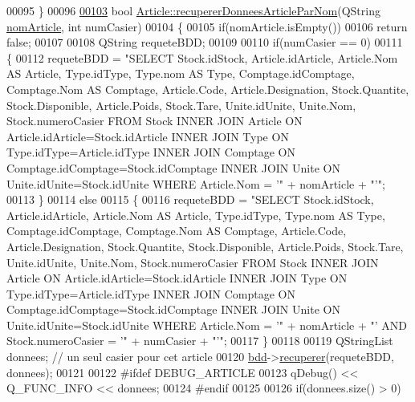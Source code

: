 \begin{DoxyCode}
00095 \}
00096 
\hyperlink{class_article_a6eab145b46f5e1786c5ddf669ffabb6e}{00103} \textcolor{keywordtype}{bool} \hyperlink{class_article_a6eab145b46f5e1786c5ddf669ffabb6e}{Article::recupererDonneesArticleParNom}(QString 
      \hyperlink{class_article_a0ba6c08f7dd54e4b7caf673ecd6b41a6}{nomArticle}, \textcolor{keywordtype}{int} numCasier)
00104 \{
00105     \textcolor{keywordflow}{if}(nomArticle.isEmpty())
00106         \textcolor{keywordflow}{return} \textcolor{keyword}{false};
00107 
00108     QString requeteBDD;
00109 
00110     \textcolor{keywordflow}{if}(numCasier == 0)
00111     \{
00112         requeteBDD = \textcolor{stringliteral}{"SELECT Stock.idStock, Article.idArticle, Article.Nom AS Article, Type.idType,
       Type.nom AS Type, Comptage.idComptage, Comptage.Nom AS Comptage, Article.Code, Article.Designation, Stock.Quantite,
       Stock.Disponible, Article.Poids, Stock.Tare, Unite.idUnite, Unite.Nom, Stock.numeroCasier FROM Stock INNER
       JOIN Article ON Article.idArticle=Stock.idArticle INNER JOIN Type ON Type.idType=Article.idType INNER JOIN
       Comptage ON Comptage.idComptage=Stock.idComptage INNER JOIN Unite ON Unite.idUnite=Stock.idUnite WHERE
       Article.Nom = '"} + nomArticle + \textcolor{stringliteral}{"'"};
00113     \}
00114     \textcolor{keywordflow}{else}
00115     \{
00116         requeteBDD = \textcolor{stringliteral}{"SELECT Stock.idStock, Article.idArticle, Article.Nom AS Article, Type.idType,
       Type.nom AS Type, Comptage.idComptage, Comptage.Nom AS Comptage, Article.Code, Article.Designation, Stock.Quantite,
       Stock.Disponible, Article.Poids, Stock.Tare, Unite.idUnite, Unite.Nom, Stock.numeroCasier FROM Stock INNER
       JOIN Article ON Article.idArticle=Stock.idArticle INNER JOIN Type ON Type.idType=Article.idType INNER JOIN
       Comptage ON Comptage.idComptage=Stock.idComptage INNER JOIN Unite ON Unite.idUnite=Stock.idUnite WHERE
       Article.Nom = '"} + nomArticle + \textcolor{stringliteral}{"' AND Stock.numeroCasier = '"} + numCasier + \textcolor{stringliteral}{"'"};
00117     \}
00118 
00119     QStringList donnees; \textcolor{comment}{// un seul casier pour cet article}
00120     \hyperlink{class_article_a7221cec4212d86d74f479b9ee683ee8a}{bdd}->\hyperlink{class_bdd_a8f25d29d309041bbf875700db0efd97b}{recuperer}(requeteBDD, donnees);
00121 
00122 \textcolor{preprocessor}{    #ifdef DEBUG\_ARTICLE}
00123         qDebug() << Q\_FUNC\_INFO << donnees;
00124 \textcolor{preprocessor}{    #endif}
00125 
00126     \textcolor{keywordflow}{if}(donnees.size() > 0)

\end{DoxyCode}
